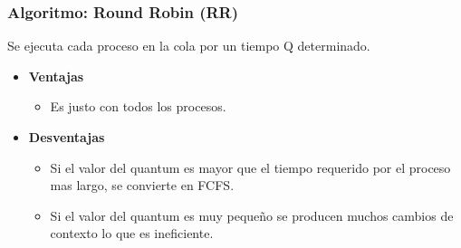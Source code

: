 \documentclass{beamer}
\newcommand{\algTitle}{\textbf{Algoritmo}: }
\begin{document}
\begin{frame}
\frametitle{\algTitle Round Robin (RR)}
Se ejecuta cada proceso en la cola por un tiempo Q determinado.

\begin{itemize}
	\item \textbf{Ventajas}
	\begin{itemize}
		\item Es justo con todos los procesos.
	\end{itemize}
	\vspace{0.5cm}
	
	\item \textbf{Desventajas}
	\begin{itemize}
		\item Si el valor del quantum es mayor que el tiempo requerido 
		por el proceso mas largo, se convierte en FCFS.
		\item Si el valor del quantum es muy pequeño se producen muchos
		cambios de contexto lo que es ineficiente.
	\end{itemize}
\end{itemize}
\end{frame}
\end{document}
